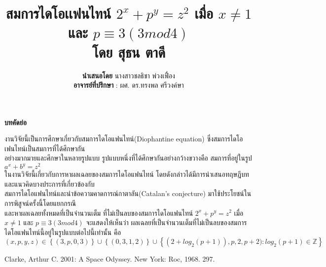 \documentclass[a4paper]{article}
\title{{\textbf{สมการไดโอเเฟนไทน์ {\large{$2^{x}+p^{y}=z^{2}$}} เมื่อ {\large{$x\neq1$}} และ {\large{$ p\equiv 3\left ( 3mod4 \right )$}}\\
โดย สุธน ตาดี}}}
\author{\Large{\textbf{นำเสนอโดย} นางสาวชลธิชา พ่วงเฟื่อง}\\
        \Large\textbf{อาจารย์ที่ปรึกษา} :  ผศ. ดร.ทรงพล ศรีวงค์ษา\\}
\date{} %
\providecommand{\keywords}[1]
{
  \large 	
  \textbf{\textit{Keywords---}} #1
}
\begin{document}
\maketitle

\begin{center}\Large\textbf{บทคัดย่อ}
\end{center}
\vspace{5pt}
\hspace*{30pt}\Large       {งานวิจัยนี้เป็นการศึกษาเกี่ยวกับสมการไดโอแฟนไทน์(Diophantine equation) ซึ่งสมการไดโอเฟนไทน์เป็นสมการที่ได้ศึกษากัน\\อย่างมากมายและศึกษาในหลายรูปแบบ รูปแบบหนึ่งที่ได้ศึกษากันอย่างกว้างขวางคือ 
สมการที่อยู่ในรูป   $a^{x}+b^{y}=z^{2}$ \\ในงานวิจัยนี้เกี่ยวกับการหาผลเฉลยของสมการไดโอแฟนไทน์ 
โดยดังกล่าวได้มีการนำเสนอทฤษฎีบทและแนวคิดบางประการที่เกี่ยวข้องกับ\\
สมการไดโอแฟนไทน์และนำข้อความคาดการณ์กาตาลัน(Catalan’s conjecture) มาใช้ประโยชน์ในการพิสูจน์ครั้งนี้โดยแยกกรณี \\และหาผลเฉลยทั้งหมดที่เป็นจำนวนเต็ม
ที่ไม่เป็นลบของสมการไดโอแฟนไทน์ $2^{x}+p^{y}=z^{2}$ เมื่อ $x\neq1$ และ $p\equiv 3\left ( 3mod4 \right )$
จะแสดงให้เห็นว่า ผลเฉลยที่เป็นจำนวนเต็มที่ไม่เป็นลบของสมการไดโอแฟนไทน์นี้อยู่ในรูปแบบต่อไปนี้เท่านั้น คือ\\
$\left ( x,p,y,z \right )\in \left \{ \left (3,p,0,3  \right ) \right \}\cup \left \{ \left ( 0,3,1,2 \right ) \right \}\cup \left \{ \left ( 2+log _{2}\left ( p+1 \right )\right ),p,2,p+2):log_{2}\left ( p+1 \right )      \in   \mathbb{Z}    \right \}$}
\hspace{30pt}
\hspace{30pt}
\newpage %



\begin{thebibliography}{00}
 Clarke, Arthur C. 2001: A Space Odyssey. New York: Roc, 1968. 297.
\end{thebibliography}


\end{document}
